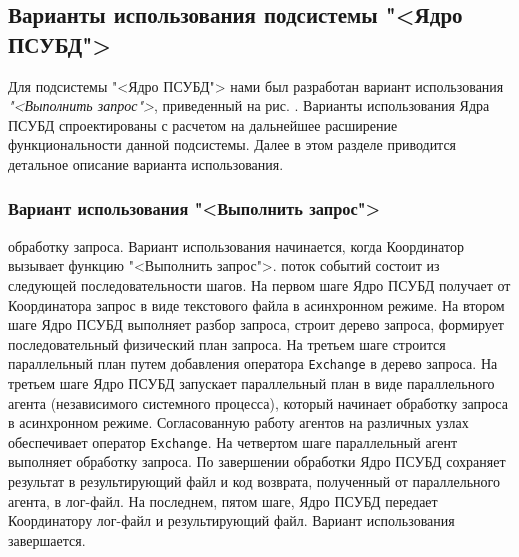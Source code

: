 \documentclass[11pt,oneside]{article}
\begin{document}
\subsection{Варианты использования подсистемы "<Ядро ПСУБД">}\label{S_KernelUseCases}


Для подсистемы "<Ядро ПСУБД"> нами был разработан вариант использования \textit{"<Выполнить запрос">}, приведенный на рис. %
. Варианты использования Ядра ПСУБД спроектированы с расчетом на дальнейшее расширение функциональности данной подсистемы. Далее в этом разделе приводится детальное описание варианта использования.

\subsubsection{Вариант использования "<Выполнить запрос">}
 обработку запроса. Вариант использования начинается, когда Координатор вызывает функцию "<Выполнить запрос">.
 поток событий состоит из следующей последовательности шагов. На первом шаге Ядро ПСУБД получает от Координатора запрос в виде текстового файла в асинхронном режиме. На втором шаге Ядро ПСУБД выполняет разбор запроса, строит дерево запроса, формирует последовательный физический план запроса. На третьем шаге строится параллельный план путем добавления оператора \texttt{Exchange} в дерево запроса. На третьем шаге Ядро ПСУБД запускает параллельный план в виде параллельного агента (независимого системного процесса), который начинает обработку запроса в асинхронном режиме. Согласованную работу агентов на различных узлах обеспечивает оператор \texttt{Exchange}. На четвертом шаге параллельный агент выполняет обработку запроса. По завершении обработки Ядро ПСУБД сохраняет результат в результирующий файл и код возврата, полученный от параллельного агента, в лог-файл.
На последнем, пятом шаге, Ядро ПСУБД передает Координатору лог-файл и результирующий файл. Вариант использования завершается.
\end{document}
